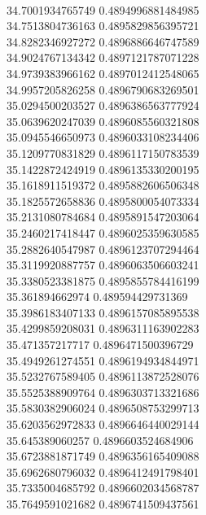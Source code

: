 { \\
34.7001934765749 0.4894996881484985
 \\
34.7513804736163 0.4895829856395721
 \\
34.8282346927272 0.4896886646747589
 \\
34.9024767134342 0.4897121787071228
 \\
34.9739383966162 0.4897012412548065
 \\
34.9957205826258 0.4896790683269501
 \\
35.0294500203527 0.4896386563777924
 \\
35.0639620247039 0.4896085560321808
 \\
35.0945546650973 0.4896033108234406
 \\
35.1209770831829 0.4896117150783539
 \\
35.1422872424919 0.4896135330200195
 \\
35.1618911519372 0.4895882606506348
 \\
35.1825572658836 0.4895800054073334
 \\
35.2131080784684 0.4895891547203064
 \\
35.2460217418447 0.4896025359630585
 \\
35.2882640547987 0.4896123707294464
 \\
35.3119920887757 0.4896063506603241
 \\
35.3380523381875 0.4895855784416199
 \\
35.361894662974 0.489594429731369
 \\
35.3986183407133 0.4896157085895538
 \\
35.4299859208031 0.4896311163902283
 \\
35.471357217717 0.4896471500396729
 \\
35.4949261274551 0.4896194934844971
 \\
35.5232767589405 0.4896113872528076
 \\
35.5525388909764 0.4896303713321686
 \\
35.5830382906024 0.4896508753299713
 \\
35.6203562972833 0.4896646440029144
 \\
35.645389060257 0.4896603524684906
 \\
35.6723881871749 0.4896356165409088
 \\
35.6962680796032 0.4896412491798401
 \\
35.7335004685792 0.4896602034568787
 \\
35.7649591021682 0.4896741509437561
 \\
}
